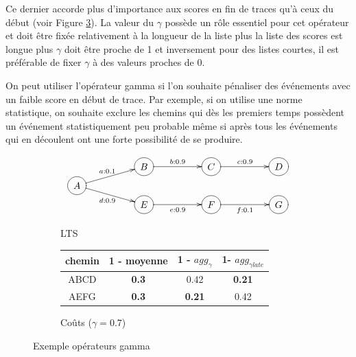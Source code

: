 \documentclass[11pt]{extarticle}
\begin{document}
    Ce dernier accorde plus d'importance aux scores en fin de traces qu'à ceux du début (voir Figure \ref{fig:gamma}). La valeur du $\gamma$ possède un rôle essentiel pour cet opérateur et doit être fixée relativement à la longueur de la liste plus la liste des scores est longue plus $\gamma$ doit être proche de 1 et inversement pour des listes courtes, il est préférable de fixer $\gamma$ à des valeurs proches de 0.
    
    
    On peut utiliser l'opérateur gamma si l'on souhaite pénaliser des événements avec un faible score en début de trace. Par exemple, si on utilise une norme statistique, on souhaite exclure les chemins qui dès les premiers temps possèdent un événement statistiquement peu probable même si après tous les événements qui en découlent ont une forte possibilité de se produire. 


    \begin{figure}[h!]
        \centering
        \begin{subfigure}[b]{0.45\textwidth}
            \centering
            \[
            \xymatrix @R=0.1em@C=5em {
             & *++[o][F-]{B} \ar[r]^{b:0.9} & *++[o][F-]{C} \ar[r]^{c:0.9} & *++[o][F-]{D}  \\
              *++[o][F-]{A} \ar[ru]^{a:0.1} \ar[rd]_{d:0.9} \\
            & *++[o][F-]{E} \ar[r]_{e:0.9} & *++[o][F-]{F} \ar[r]_{f:0.1}  & *++[o][F-]{G}
            }
            \]
            \caption{LTS}
            \label{fig:lts_gamma}
        \end{subfigure}
        \hfill
        \begin{subfigure}[b]{0.45\textwidth}
            \centering
            \begin{tabular}{cccc}
                chemin & 1 - moyenne & 1 - $agg_{\gamma}$ & 1- $agg_{\gamma late}$  \\
                \hline
                ABCD & \textbf{ 0.3} & 0.42 &\textbf{ 0.21} \\
                AEFG & \textbf{0.3} & \textbf{0.21} & 0.42\\
            \end{tabular}
            \caption{Coûts ($\gamma =0.7$)}
            \label{fig:Coûts}
        \end{subfigure}
        \caption{Exemple opérateurs gamma}
        \label{fig:gamma}
    \end{figure}
\end{document}
